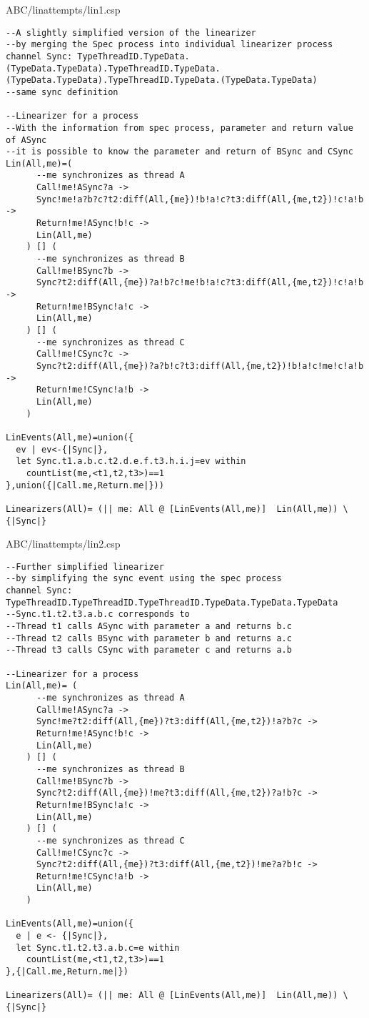 \lstset{breaklines,basicstyle=\scriptsize}
ABC/linattempts/lin1.csp
\begin{lstlisting}
--A slightly simplified version of the linearizer
--by merging the Spec process into individual linearizer process
channel Sync: TypeThreadID.TypeData.(TypeData.TypeData).TypeThreadID.TypeData.(TypeData.TypeData).TypeThreadID.TypeData.(TypeData.TypeData)
--same sync definition

--Linearizer for a process
--With the information from spec process, parameter and return value of ASync
--it is possible to know the parameter and return of BSync and CSync
Lin(All,me)=(
      --me synchronizes as thread A
      Call!me!ASync?a ->
      Sync!me!a?b?c?t2:diff(All,{me})!b!a!c?t3:diff(All,{me,t2})!c!a!b ->
      Return!me!ASync!b!c ->
      Lin(All,me)
    ) [] (
      --me synchronizes as thread B
      Call!me!BSync?b ->
      Sync?t2:diff(All,{me})?a!b?c!me!b!a!c?t3:diff(All,{me,t2})!c!a!b ->
      Return!me!BSync!a!c ->
      Lin(All,me)
    ) [] (
      --me synchronizes as thread C
      Call!me!CSync?c ->
      Sync?t2:diff(All,{me})?a?b!c?t3:diff(All,{me,t2})!b!a!c!me!c!a!b ->
      Return!me!CSync!a!b ->
      Lin(All,me)
    )

LinEvents(All,me)=union({
  ev | ev<-{|Sync|},
  let Sync.t1.a.b.c.t2.d.e.f.t3.h.i.j=ev within
    countList(me,<t1,t2,t3>)==1
},union({|Call.me,Return.me|}))

Linearizers(All)= (|| me: All @ [LinEvents(All,me)]  Lin(All,me)) \ {|Sync|}
\end{lstlisting}
ABC/linattempts/lin2.csp
\begin{lstlisting}
--Further simplified linearizer
--by simplifying the sync event using the spec process
channel Sync: TypeThreadID.TypeThreadID.TypeThreadID.TypeData.TypeData.TypeData
--Sync.t1.t2.t3.a.b.c corresponds to
--Thread t1 calls ASync with parameter a and returns b.c
--Thread t2 calls BSync with parameter b and returns a.c
--Thread t3 calls CSync with parameter c and returns a.b

--Linearizer for a process
Lin(All,me)= (
      --me synchronizes as thread A
      Call!me!ASync?a ->
      Sync!me?t2:diff(All,{me})?t3:diff(All,{me,t2})!a?b?c ->
      Return!me!ASync!b!c ->
      Lin(All,me)
    ) [] (
      --me synchronizes as thread B
      Call!me!BSync?b ->
      Sync?t2:diff(All,{me})!me?t3:diff(All,{me,t2})?a!b?c ->
      Return!me!BSync!a!c ->
      Lin(All,me)
    ) [] (
      --me synchronizes as thread C
      Call!me!CSync?c ->
      Sync?t2:diff(All,{me})?t3:diff(All,{me,t2})!me?a?b!c ->
      Return!me!CSync!a!b ->
      Lin(All,me)
    )

LinEvents(All,me)=union({
  e | e <- {|Sync|},
  let Sync.t1.t2.t3.a.b.c=e within
    countList(me,<t1,t2,t3>)==1
},{|Call.me,Return.me|})

Linearizers(All)= (|| me: All @ [LinEvents(All,me)]  Lin(All,me)) \ {|Sync|}
\end{lstlisting}
